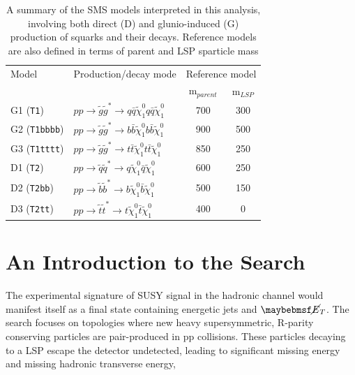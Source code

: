 \begin{table}[h!]
\footnotesize
\begin{center}
\begin{tabular*}{0.75\textwidth}{@{\extracolsep{\fill}}llcc}
\hline
Model & Production/decay mode &  \multicolumn{2}{c}{Reference model}\\ 
&& m$_{parent}$ & m$_{LSP}$ \\  \hline\hline
G1 (\texttt{T1}) & $ pp \rightarrow \widetilde{g}\widetilde{g}^{*} \rightarrow q\bar{q}\widetilde{\chi}^{0}_{1}q\bar{q}\widetilde{\chi}^{0}_{1}$ & 700 & 300 \\
G2 (\texttt{T1bbbb}) & $ pp \rightarrow \widetilde{g}\widetilde{g}^{*} \rightarrow b\bar{b}\widetilde{\chi}^{0}_{1}b\bar{b}\widetilde{\chi}^{0}_{1}$ & 900 & 500 \\
G3 (\texttt{T1tttt}) & $ pp \rightarrow \widetilde{g}\widetilde{g}^{*} \rightarrow t\bar{t}\widetilde{\chi}^{0}_{1}t\bar{t}\widetilde{\chi}^{0}_{1}$ & 850 & 250 \\
D1 (\texttt{T2}) & $ pp \rightarrow \widetilde{q}\widetilde{q}^{*} \rightarrow q\widetilde{\chi}^{0}_{1}\bar{q}\widetilde{\chi}^{0}_{1}$ & 600 & 250 \\
D2 (\texttt{T2bb}) & $ pp \rightarrow \widetilde{b}\widetilde{b}^{*} \rightarrow b\widetilde{\chi}^{0}_{1}\bar{b}\widetilde{\chi}^{0}_{1}$ & 500 & 150 \\
D3 (\texttt{T2tt}) & $ pp \rightarrow \widetilde{t}\widetilde{t}^{*} \rightarrow t\widetilde{\chi}^{0}_{1}\bar{t}\widetilde{\chi}^{0}_{1}$ & 400 & 0 \\
\cline{1-4}
\end{tabular*}
\end{center}
\caption[A summary of the \ac{SMS} models interpreted in this analysis, involving both direct (D) and glunio-induced (G) production of squarks and their decays.]{A summary of the \ac{SMS} models interpreted in this analysis, involving both direct (D) and glunio-induced (G) production of squarks and their decays. Reference models are also defined in terms of parent and \ac{LSP} sparticle mass }
\label{tab:sms_model_table}
\end{table}

\section{An Introduction to the \alphat Search}
\label{sec:alphatintroduction}

The experimental signature of \ac{SUSY} signal in the hadronic channel would manifest itself as a final state containing energetic jets and $\met$. The search focuses on topologies where new heavy supersymmetric, R-parity conserving particles are pair-produced in pp collisions. These particles decaying to a \ac{LSP} escape the detector undetected, leading to significant missing energy and missing hadronic transverse energy,

